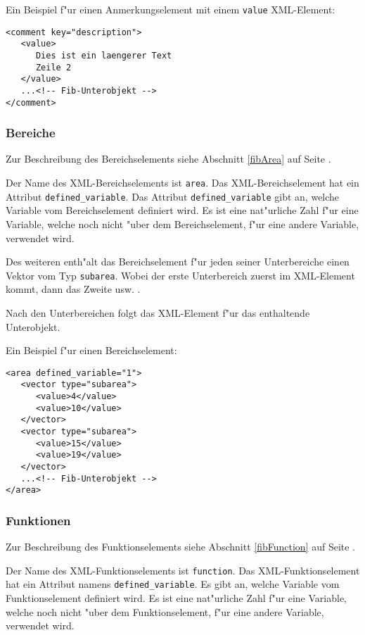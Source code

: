 \bigskip\noindent
Ein Beispiel f"ur einen Anmerkungselement mit einem \verb|value| XML-Element:
\begin{verbatim}
<comment key="description">
   <value>
      Dies ist ein laengerer Text
      Zeile 2
   </value>
   ...<!-- Fib-Unterobjekt -->
</comment>
\end{verbatim}



\subsubsection{Bereiche}

Zur Beschreibung des Bereichselements siehe Abschnitt \ref{fibArea} auf Seite \pageref{fibArea} .

Der Name des XML-Bereichselements ist \verb|area|. Das XML-Bereichselement hat ein Attribut \verb|defined_variable|. Das Attribut \verb|defined_variable| gibt an, welche Variable vom Bereichselement definiert wird. Es ist eine nat"urliche Zahl f"ur eine Variable, welche noch nicht "uber dem Bereichselement, f"ur eine andere Variable, verwendet wird.

Des weiteren enth"alt das Bereichselement f"ur jeden seiner Unterbereiche einen Vektor vom Typ \verb|subarea|. Wobei der erste Unterbereich zuerst im XML-Element kommt, dann das Zweite usw. .

Nach den Unterbereichen folgt das XML-Element f"ur das enthaltende Unterobjekt.

\bigskip\noindent
Ein Beispiel f"ur einen Bereichselement:
\begin{verbatim}
<area defined_variable="1">
   <vector type="subarea">
      <value>4</value>
      <value>10</value>
   </vector>
   <vector type="subarea">
      <value>15</value>
      <value>19</value>
   </vector>
   ...<!-- Fib-Unterobjekt -->
</area>
\end{verbatim}



\subsubsection{Funktionen}

Zur Beschreibung des Funktionselements siehe Abschnitt \ref{fibFunction} auf Seite \pageref{fibFunction} .

Der Name des XML-Funktionselements ist \verb|function|. Das XML-Funk\-tions\-ele\-ment hat ein Attribut namens \verb|defined_variable|. Es gibt an, welche Variable vom Funktionselement definiert wird. Es ist eine nat"urliche Zahl f"ur eine Variable, welche noch nicht "uber dem Funktionselement, f"ur eine andere Variable, verwendet wird.


